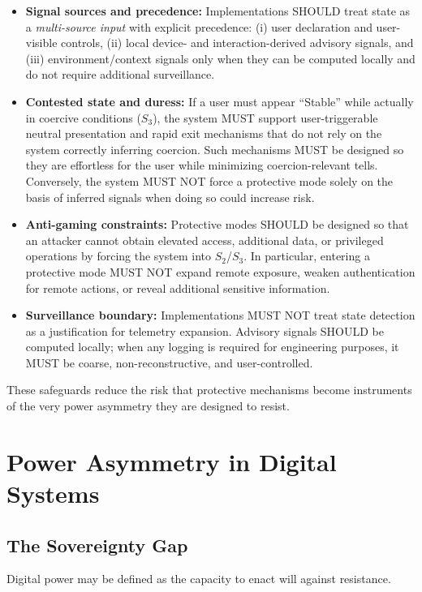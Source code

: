 \documentclass[12pt]{article}
\begin{document}
\begin{itemize}
\item \textbf{Signal sources and precedence:} Implementations SHOULD treat state as a \emph{multi-source input} with explicit precedence: (i) user declaration and user-visible controls, (ii) local device- and interaction-derived advisory signals, and (iii) environment/context signals only when they can be computed locally and do not require additional surveillance.
\item \textbf{Contested state and duress:} If a user must appear ``Stable'' while actually in coercive conditions ($S_3$), the system MUST support user-triggerable neutral presentation and rapid exit mechanisms that do not rely on the system correctly inferring coercion. Such mechanisms MUST be designed so they are effortless for the user while minimizing coercion-relevant tells. Conversely, the system MUST NOT force a protective mode solely on the basis of inferred signals when doing so could increase risk.
\item \textbf{Anti-gaming constraints:} Protective modes SHOULD be designed so that an attacker cannot obtain elevated access, additional data, or privileged operations by forcing the system into $S_2$/$S_3$. In particular, entering a protective mode MUST NOT expand remote exposure, weaken authentication for remote actions, or reveal additional sensitive information.
\item \textbf{Surveillance boundary:} Implementations MUST NOT treat state detection as a justification for telemetry expansion. Advisory signals SHOULD be computed locally; when any logging is required for engineering purposes, it MUST be coarse, non-reconstructive, and user-controlled.
\end{itemize}

These safeguards reduce the risk that protective mechanisms become instruments of the very power asymmetry they are designed to resist.

\section{Power Asymmetry in Digital Systems}

\subsection{The Sovereignty Gap}
Digital power may be defined as the capacity to enact will against resistance.
\end{document}
